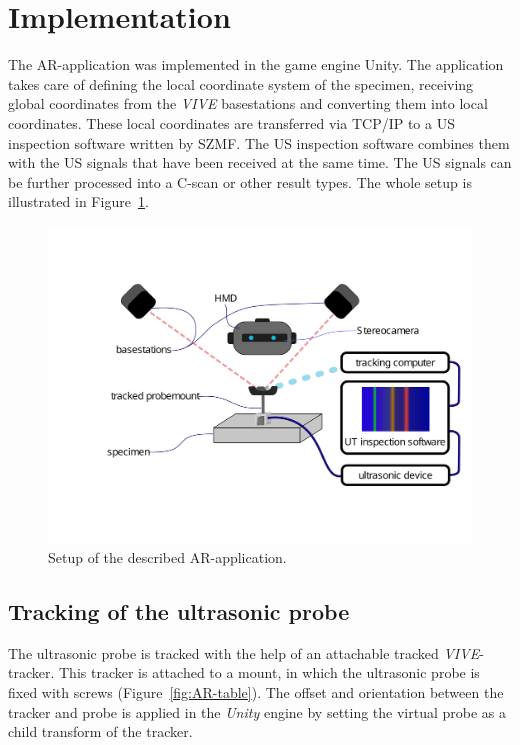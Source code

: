 \documentclass{VRARWorkshop}
\begin{document}
\section{Implementation}
The AR-application was implemented in the game engine Unity.
The application takes care of defining the local coordinate system of the specimen, receiving global coordinates from the \textit{VIVE} basestations and converting them into local coordinates.
These local coordinates are transferred via TCP/IP to a US inspection software written by SZMF.
The US inspection software combines them with the US signals that have been received at the same time.
The US signals can be further processed into a C-scan or other result types.
The whole setup is illustrated in Figure~\ref{fig:Setup}. 
\begin{figure}[h!]
    \begin{center}
        \includegraphics[width=158mm]{images/Setup-ARUS}
        \caption{\label{fig:Setup} Setup of the described AR-application.}
    \end{center}
\end{figure}
\subsection{Tracking of the ultrasonic probe}
The ultrasonic probe is tracked with the help of an attachable tracked \textit{VIVE}-tracker.
This tracker is attached to a mount, in which the ultrasonic probe is fixed with screws (Figure~\ref{fig:AR-table}).
The offset and orientation between the tracker and probe is applied in the \textit{Unity} engine by setting the virtual probe as a child transform of the tracker.
\end{document}

